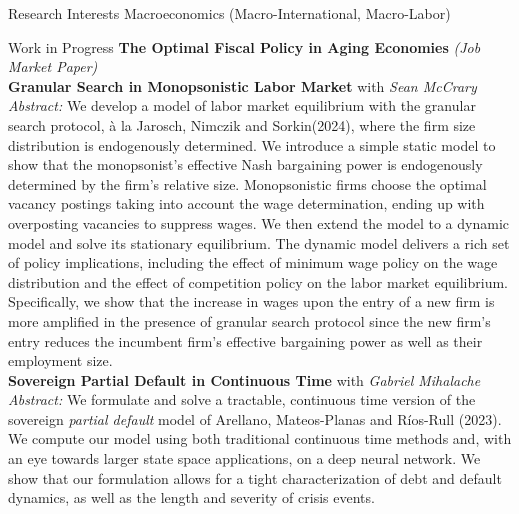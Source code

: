 \documentclass{cv} %
\begin{document}
\begin{rSection}{Research Interests}
Macroeconomics (Macro-International, Macro-Labor)
\end{rSection}
\bigskip
\begin{rSection}{Work in Progress}
\medskip
{\bf The Optimal Fiscal Policy in Aging Economies} \emph{(Job Market Paper)} \\


\medskip
{\bf Granular Search in Monopsonistic Labor Market} with \emph{Sean McCrary} \\
\begin{adjustbox}{minipage=0.95\textwidth, right}
	\vspace{0.3em} {\emph{Abstract:} We develop a model of labor market equilibrium with the granular search protocol, à la Jarosch, Nimczik and Sorkin(2024), where the firm size distribution is endogenously determined. We introduce a simple static model to show that the monopsonist's effective Nash bargaining power is endogenously determined by the firm's relative size. Monopsonistic firms choose the optimal vacancy postings taking into account the wage determination, ending up with overposting vacancies to suppress wages. We then extend the model to a  dynamic model and solve its stationary equilibrium. The dynamic model delivers a rich set of policy implications, including the effect of minimum wage policy on the wage distribution and the effect of competition policy on the labor market equilibrium. Specifically, we show that the increase in wages upon the entry of a new firm is more amplified in the presence of granular search protocol since the new firm's entry reduces the incumbent firm's effective bargaining power as well as their employment size.}
\end{adjustbox}\\

\medskip
{\bf Sovereign Partial Default in Continuous Time} with \emph{Gabriel Mihalache} \\
	 \begin{adjustbox}{minipage=0.95\textwidth, right}
		\vspace{0.3em} {\emph{Abstract:} We formulate and solve a tractable, continuous time version of the sovereign \emph{partial default} model of Arellano, Mateos-Planas and Ríos-Rull (2023). We compute our model using both traditional continuous time methods and, with an eye towards larger state space applications, on a deep neural network. We show that our formulation allows for a tight characterization of debt and default dynamics, as well as the length and severity of crisis events.}
	\end{adjustbox}\\


\end{rSection}
\end{document}
